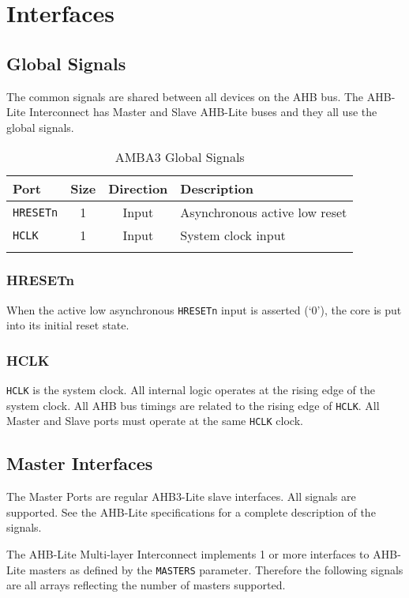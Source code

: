 \chapter{Interfaces}\label{interfaces}


\section{Global Signals}\label{global-signals}

The common signals are shared between all devices on the AHB bus. The
AHB-Lite Interconnect has Master and Slave AHB-Lite buses and they all
use the global signals.

\begin{longtable}[]{@{}lccl@{}}
\toprule
Port & Size & Direction & Description\tabularnewline
\midrule
\endhead
\texttt{HRESETn} & 1 & Input & Asynchronous active low reset\tabularnewline
\texttt{HCLK} & 1 & Input & System clock input\tabularnewline
\bottomrule
\caption{AMBA3 Global Signals}
\end{longtable}

\subsection{HRESETn}\label{hresetn}

When the active low asynchronous \texttt{HRESETn} input is asserted (`0'), the
core is put into its initial reset state.

\subsection{HCLK}\label{hclk}

\texttt{HCLK} is the system clock. All internal logic operates at the rising edge
of the system clock. All AHB bus timings are related to the rising edge
of \texttt{HCLK}. All Master and Slave ports must operate at the same \texttt{HCLK} clock.

\section{Master Interfaces}\label{master-interfaces}

The Master Ports are regular AHB3-Lite slave interfaces. All signals are
supported. See the AHB-Lite specifications for a complete description of
the signals.

The AHB-Lite Multi-layer Interconnect implements 1 or more interfaces to AHB-Lite masters
as defined by the \texttt{MASTERS} parameter. Therefore the following signals are all
arrays reflecting the number of masters supported.

